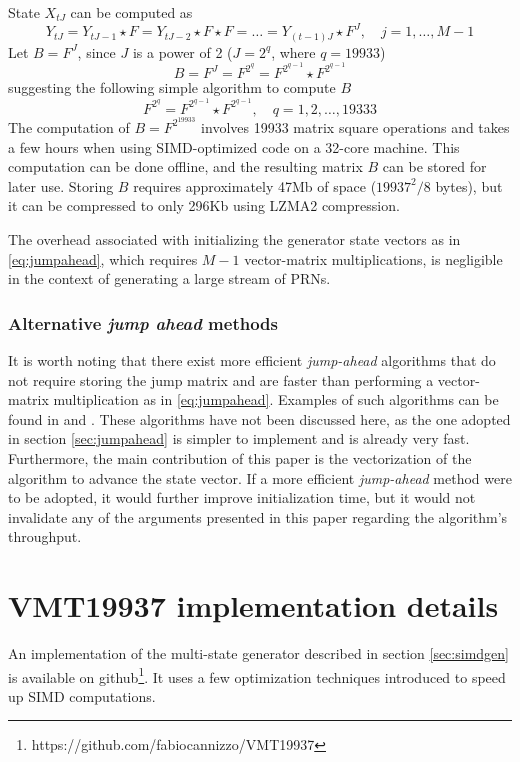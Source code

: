 \documentclass[preprint,1p,times]{elsarticle}
\begin{document}
	State $X_{tJ}$ can be computed as
	\begin{equation}
		\label{eq:jumpahead}
		Y_{tJ} = Y_{tJ-1} \star F = Y_{tJ-2}  \star F \star F = \ldots = Y_{(t-1)J}  \star F^{J}, \quad j=1,\dots,M-1
	\end{equation}
	Let $B=F^J$, since $J$ is a power of 2 ($J=2^{q}$, where $q=19933$)
	$$
	B=F^{J}=F^{2^q}=F^{2^{q-1}} \star F^{2^{q-1}}
	$$
	suggesting the following simple algorithm to compute $B$
	$$
	F^{2^q} = F^{2^{q-1}} \star F^{2^{q-1}}, \quad q=1, 2, \dots, 19333
	$$
	The computation of $B=F^{2^{19933}}$ involves 19933 matrix square operations and takes a few hours when using SIMD-optimized code on a 32-core machine. This computation can be done offline, and the resulting matrix $B$ can be stored for later use. Storing $B$ requires approximately 47Mb of space ($19937^2/8$ bytes), but it can be compressed to only 296Kb using LZMA2 compression.
	
	The overhead associated with initializing the generator state vectors as in \eqref{eq:jumpahead}, which requires $M\!-\!1$ vector-matrix multiplications, is negligible in the context of generating a large stream of PRNs.
	
	\subsubsection{Alternative \textit{jump ahead} methods}
	It is worth noting that there exist more efficient \textit{jump-ahead} algorithms that do not require storing the jump matrix and are faster than performing a vector-matrix multiplication as in \eqref{eq:jumpahead}. Examples of such algorithms can be found in \cite{jump1} and \cite{jump2}. These algorithms have not been discussed here, as the one adopted in section \ref{sec:jumpahead} is simpler to implement and is already very fast.
	Furthermore, the main contribution of this paper is the vectorization of the algorithm to advance the state vector. If a more efficient \textit{jump-ahead} method were to be adopted, it would further improve initialization time, but it would not invalidate any of the arguments presented in this paper regarding the algorithm's throughput.
	
	\section{VMT19937 implementation details}
	An implementation of the multi-state generator described in section \ref{sec:simdgen} is available on github\footnote{\label{fn:github} https://github.com/fabiocannizzo/VMT19937}. It uses a few optimization techniques introduced to speed up SIMD computations.
	
\end{document}
